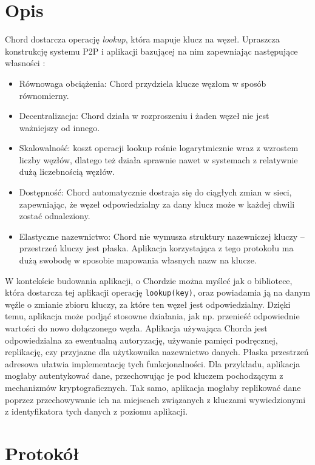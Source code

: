 \documentclass[12pt, twoside, openany]{report}
\begin{document}
\section{Opis}
Chord dostarcza operację \textit{lookup}, która mapuje klucz na węzeł. Upraszcza konstrukcję systemu P2P i aplikacji bazującej na nim zapewniając następujące własności \cite{bib:chord}:

\begin{itemize}
\item Równowaga obciążenia: Chord przydziela klucze węzłom w sposób równomierny.

\item Decentralizacja: Chord działa w rozproszeniu i żaden węzeł nie jest ważniejszy od innego.

\item Skalowalność: koszt operacji lookup rośnie logarytmicznie wraz z wzrostem liczby węzłów, dlatego też działa sprawnie nawet w systemach z relatywnie dużą liczebnością węzłów.

\item Dostępność: Chord automatycznie dostraja się do ciągłych zmian w sieci, zapewniając, że węzeł odpowiedzialny za dany klucz może w każdej chwili zostać odnaleziony.

\item Elastyczne nazewnictwo: Chord nie wymusza struktury nazewniczej kluczy -- przestrzeń kluczy jest płaska. Aplikacja korzystająca z tego protokołu ma dużą swobodę w sposobie mapowania własnych nazw na klucze.
\end{itemize}

W kontekście budowania aplikacji, o Chordzie można myśleć jak o bibliotece, która dostarcza tej aplikacji operację \texttt{lookup(key)}, oraz powiadamia ją na danym węźle o zmianie zbioru kluczy, za które ten węzeł jest odpowiedzialny. Dzięki temu, aplikacja może podjąć stosowne działania, jak np. przenieść odpowiednie wartości do nowo dołączonego węzła. Aplikacja używająca Chorda jest odpowiedzialna za ewentualną autoryzację, używanie pamięci podręcznej, replikację, czy przyjazne dla użytkownika nazewnictwo danych. Płaska przestrzeń
adresowa ułatwia implementację tych funkcjonalności. Dla przykładu, aplikacja mogłaby autentykować dane, przechowując je pod kluczem pochodzącym z mechanizmów kryptograficznych. Tak samo, aplikacja mogłaby replikować dane poprzez przechowywanie ich na miejscach związanych z kluczami wywiedzionymi z identyfikatora tych danych z poziomu aplikacji.


\section{Protokół}
\label{protokol_chord}
\end{document}
